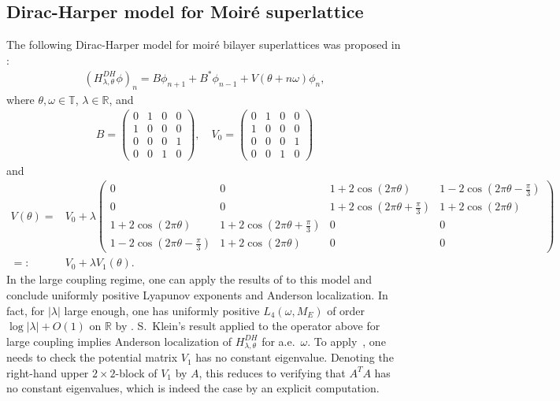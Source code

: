 \documentclass[11pt]{amsart}
\newcommand{\R}{\mathbb R}
\newcommand{\T}{\mathbb T}
\begin{document}
\subsection{Dirac-Harper model for Moir\'e superlattice}
The following Dirac-Harper model for moir\'e bilayer superlattices was proposed in \cite{TM}:
\begin{align}
(H^{DH}_{\lambda,\theta}\phi)_n=B\phi_{n+1}+B^*\phi_{n-1}+V(\theta+n\omega) \phi_n,
\end{align}
where $\theta,\omega\in \T$, $\lambda\in \R$, and
\begin{align}
B=\left(\begin{matrix}
        0 &1 & 0 &0\\
        1 &0 &0 &0\\
        0 &0 &0 &1\\
        0 &0 &1 &0
    \end{matrix}\right), \quad V_0=
    \left(\begin{matrix}
        0 &1 &0 &0\\
        1 &0 &0 &0\\
        0 &0 &0 &1\\
        0 &0 &1 &0
    \end{matrix}\right)
\end{align}
and 
\begin{align}
    V(\theta)=&
    V_0
    +\lambda \left(\begin{matrix}
0 &0 &1+2\cos(2\pi\theta) &1-2\cos(2\pi\theta-\frac{\pi}{3})\\
0 &0 &1+2\cos(2\pi\theta+\frac{\pi}{3}) &1+2\cos(2\pi\theta)\\
1+2\cos(2\pi\theta) &1+2\cos(2\pi\theta+\frac{\pi}{3}) &0 &0\\
1-2\cos(2\pi\theta-\frac{\pi}{3})& 1+2\cos(2\pi\theta) &0 &0
    \end{matrix}\right)\\
    =:&V_0+\lambda V_1(\theta).
\end{align}
In the large coupling regime, one can apply the results of \cite{DK1,Kl} to this model and conclude uniformly positive Lyapunov exponents and Anderson localization. In fact, for $|\lambda|$ large enough, one has uniformly positive $L_4(\omega,M_E)$ of order $\log |\lambda|+O(1)$ on $\R$ by \cite[Theorem 2.3]{DK1}.
S.~Klein's result \cite{Kl} applied to the operator above for  large coupling  implies Anderson localization of $H^{DH}_{\lambda,\theta}$ for a.e.~$\omega$. To apply~\cite{DK1,Kl}, one needs to check the potential matrix $V_1$ has no constant eigenvalue. Denoting the right-hand upper $2\times 2$-block of $V_1$ by $A$, this reduces to verifying that $A^TA$ has no constant eigenvalues, which is indeed the case by an explicit computation. 
\end{document}
